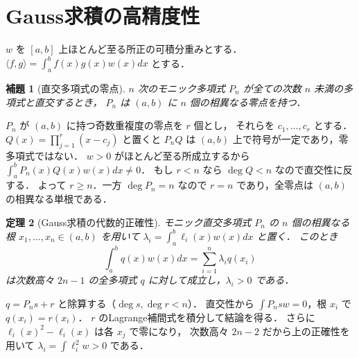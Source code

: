 \documentclass[a5paper,10pt,onecolumn]{jsarticle}
\makeatletter
\theoremstyle{mathnotetheorem}
\newtheorem{theorem}{定理}[section]
\newtheorem{lemma}[theorem]{補題}
\renewcommand{\proofname}{証明}
\renewenvironment{proof}[1][\proofname]{%
  \par\pushQED{\qed}\normalfont\topsep4\p@\@plus2\p@\relax
  \trivlist\item[\hskip\labelsep\bfseries #1]\ignorespaces
}{\popQED\endtrivlist\@endpefalse}
\makeatother
\begin{document}
\section{Gauss求積の高精度性}
$w$ を $[a,b]$ 上ほとんど至る所正の可積分重みとする．
$\langle f,g\rangle=\int_a^b f(x)g(x)w(x)dx$ とする．
\begin{lemma}[直交多項式の零点]
$n$ 次のモニック多項式 $P_n$ が全ての次数 $n$ 未満の多項式と直交するとき，
$P_n$ は $(a,b)$ に $n$ 個の相異なる零点を持つ．
\end{lemma}
\begin{proof}
$P_n$ が $(a,b)$ に持つ奇数重複度の零点を $r$ 個とし，
それらを $c_1,\ldots,c_r$ とする．
$Q(x)=\prod_{j=1}^r(x-c_j)$ と置くと $P_nQ$ は
$(a,b)$ 上で符号が一定であり，零多項式ではない．
$w>0$ がほとんど至る所成立するから
$\int_a^bP_n(x)Q(x)w(x)dx\ne0$．
もし $r<n$ なら $\deg Q<n$ なので直交性に反する．
よって $r\ge n$．一方 $\deg P_n=n$ なので
$r=n$ であり，全零点は $(a,b)$ の相異なる単根である．
\end{proof}
\begin{theorem}[Gauss求積の代数的正確性]
モニック直交多項式 $P_n$ の $n$ 個の相異なる根
$x_1,\ldots,x_n\in(a,b)$ を用いて
$\lambda_i=\int_a^b\ell_i(x)w(x)dx$ と置く．
このとき
\[
 \int_a^bq(x)w(x)dx=\sum_{i=1}^n\lambda_iq(x_i)
\]
は次数高々 $2n-1$ の全多項式 $q$ に対して成立し，$\lambda_i>0$ である．
\end{theorem}
\begin{proof}
$q=P_ns+r$ と除算する（$\deg s,\deg r<n$）．
直交性から $\int P_nsw=0$，根 $x_i$ で $q(x_i)=r(x_i)$．
$r$ のLagrange補間式を積分して結論を得る．
さらに $\ell_i(x)^2-\ell_i(x)$ は各 $x_j$ で零になり，
次数高々 $2n-2$ だから上の正確性を用いて
$\lambda_i=\int\ell_i^2w>0$ である．
\end{proof}
\end{document}
